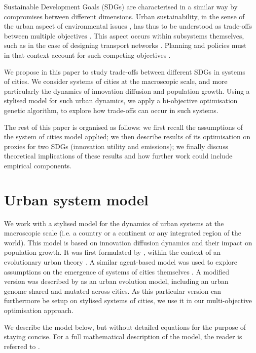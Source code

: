 \documentclass[final,5p,times,twocolumn,authoryear]{elsarticle}
\begin{document}
Sustainable Development Goals (SDGs) are characterised in a similar way by compromises between different dimensions. Urban sustainability, in the sense of the urban aspect of environmental issues \citep{finco2001pathways}, has thus to be understood as trade-offs between multiple objectives \citep{viguie2012trade}. This aspect occurs within subsystems themselves, such as in the case of designing transport networks \citep{sharma2011multiobjective}. Planning and policies must in that context account for such competing objectives \citep{caparros2015optimised}. 


We propose in this paper to study trade-offs between different SDGs in systems of cities. We consider systems of cities at the macroscopic scale, and more particularly the dynamics of innovation diffusion and population growth. Using a stylised model for such urban dynamics, we apply a bi-objective optimisation genetic algorithm, to explore how trade-offs can occur in such systems.

The rest of this paper is organised as follows: we first recall the assumptions of the system of cities model applied; we then describe results of its optimisation on proxies for two SDGs (innovation utility and emissions); we finally discuss theoretical implications of these results and how further work could include empirical components.



\section{Urban system model}

We work with a stylised model for the dynamics of urban systems at the macroscopic scale (i.e. a country or a continent or any integrated region of the world). This model is based on innovation diffusion dynamics and their impact on population growth. It was first formulated by \cite{favaro2011gibrat}, within the context of an evolutionary urban theory \citep{pumain1997pour}. A similar agent-based model was used to explore assumptions on the emergence of systems of cities themselves \citep{schmitt2015half}. A modified version was described by \cite{raimbault2020model} as an urban evolution model, including an urban genome shared and mutated across cities. As this particular version can furthermore be setup on stylised systems of cities, we use it in our multi-objective optimisation approach.

We describe the model below, but without detailed equations for the purpose of staying concise. For a full mathematical description of the model, the reader is referred to \cite{raimbault2020model}.
\end{document}
